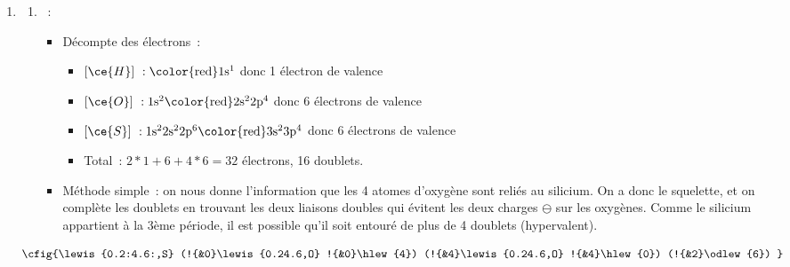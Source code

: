 \documentclass[a4paper, 12pt, final, garamond]{book}
\begin{document}
\begin{enumerate}[start=3]
    \item 
        \begin{enumerate}[leftmargin=20pt]
            \item
            \begin{itemize}[label=$\diamond$, leftmargin=10pt]
                ~:
                    \begin{itemize}[label=$\triangleright$, leftmargin=20pt]
                        \item Décompte des électrons~:
                            \begin{itemize}[label=$\ra$, leftmargin=20pt]
                                \item $[\ce{H}]~: \rm \color{red}1s^1$
                                    donc 1 électron de valence
                                \item $[\ce{O}]~: \rm 1s^2\color{red}2s^22p^4$
                                    donc 6 électrons de valence
                                \item $[\ce{S}]~: \rm
                                    1s^22s^22p^6\color{red}3s^23p^4$
                                    donc 6 électrons de valence
                                \item Total~: $2*1 + 6 + 4*6 = 32$ électrons, 16
                                    doublets.
                            \end{itemize}
                        \item Méthode simple~: on nous donne l'information que
                            les 4 atomes d'oxygène sont reliés au silicium. On a
                            donc le squelette, et on complète les doublets en
                            trouvant les deux liaisons doubles qui évitent les
                            deux charges $\ominus$ sur les oxygènes. Comme le
                            silicium appartient à la 3ème période, il est
                            possible qu'il soit entouré de plus de 4 doublets
                            (hypervalent).
                    \end{itemize}
            \end{itemize}
        \end{enumerate}
    \smallbreak
    \[
        \cfig{\lewis{0.2:4.6:,S}
            (!{&0}\lewis{0.24.6,O}
            !{&0}\hlew{4})
            (!{&4}\lewis{0.24.6,O}
            !{&4}\hlew{0})
            (!{&2}\odlew{6})
}\]
\end{enumerate}
\end{document}
